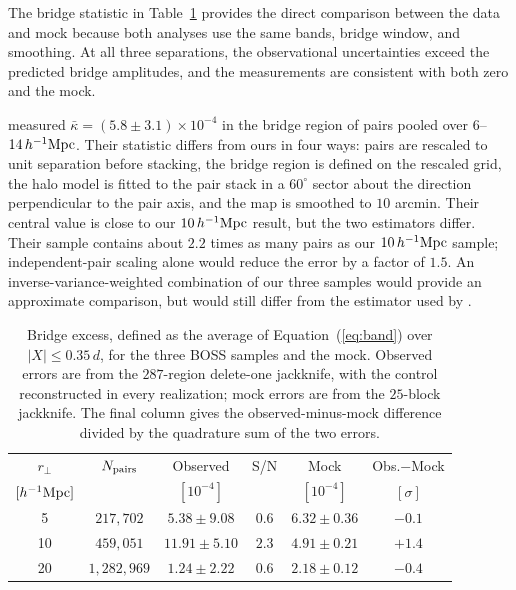 \documentclass[preprint]{aastex701}
\newcommand{\hinvMpc}{h^{-1}{\rm Mpc}}
\begin{document}

The bridge statistic in Table~\ref{tab:bridge} provides the direct comparison
between the data and mock because both analyses use the same bands, bridge
window, and smoothing. At all three separations, the observational
uncertainties exceed the predicted bridge amplitudes, and the measurements
are consistent with both zero and the mock.

\citet{deGraaff2019} measured
$\bar\kappa=(5.8\pm3.1)\times10^{-4}$ in the bridge region of pairs pooled
over $6$--$14\,\hinvMpc$. Their statistic differs from ours in four ways:
pairs are rescaled to unit separation before stacking, the bridge region is
defined on the rescaled grid, the halo model is fitted to the pair stack in
a $60^\circ$ sector about the direction perpendicular to the pair axis, and
the map is smoothed to $10$ arcmin. Their central value is close to our
$10\,\hinvMpc$ result, but the two estimators differ. Their
sample contains about $2.2$ times as many pairs as our $10\,\hinvMpc$
sample; independent-pair scaling alone would reduce the error by a factor of
$1.5$.
An inverse-variance-weighted combination of our three samples would provide
an approximate comparison, but would still differ from the estimator used by
\citet{deGraaff2019}.

\begin{table}
  \centering
  \caption{Bridge excess, defined as the average of Equation~(\ref{eq:band})
  over $|X|\leq0.35\,d$, for the three BOSS samples and the mock. Observed
  errors are from the $287$-region delete-one jackknife, with the control
  reconstructed in every realization; mock errors are from the $25$-block
  jackknife. The final column gives the observed-minus-mock difference divided
  by the quadrature sum of the two errors.}
  \label{tab:bridge}
  \begin{tabular}{cccccc}
    \hline
    $r_{\perp}$ & $N_{\rm pairs}$ & Observed & S/N & Mock & Obs.$-$Mock \\
    $[\hinvMpc]$ & & $[10^{-4}]$ & & $[10^{-4}]$ & $[\sigma]$ \\
    \hline
    5  & $217{,}702$   & $5.38\pm9.08$  & $0.6$ & $6.32\pm0.36$ & $-0.1$ \\
    10 & $459{,}051$   & $11.91\pm5.10$ & $2.3$ & $4.91\pm0.21$ & $+1.4$ \\
    20 & $1{,}282{,}969$ & $1.24\pm2.22$  & $0.6$ & $2.18\pm0.12$ & $-0.4$ \\
    \hline
  \end{tabular}
\end{table}
\end{document}
